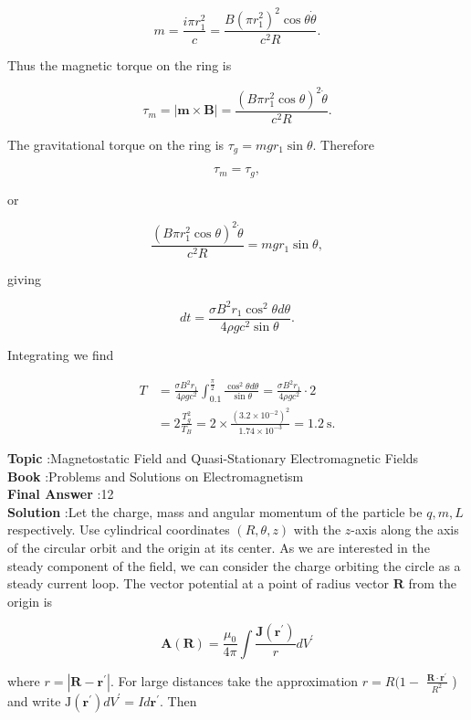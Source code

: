 \documentclass[10pt]{article}
\begin{document}
$$
m=\frac{i \pi r_{1}^{2}}{c}=\frac{B\left(\pi r_{1}^{2}\right)^{2} \cos \theta \dot{\theta}}{c^{2} R} .
$$

Thus the magnetic torque on the ring is

$$
\tau_{m}=|\mathbf{m} \times \mathbf{B}|=\frac{\left(B \pi r_{1}^{2} \cos \theta\right)^{2} \dot{\theta}}{c^{2} R} .
$$

The gravitational torque on the ring is $\tau_{g}=m g r_{1} \sin \theta$. Therefore

$$
\tau_{m}=\tau_{g},
$$

or

$$
\frac{\left(B \pi r_{1}^{2} \cos \theta\right)^{2} \dot{\theta}}{c^{2} R}=m g r_{1} \sin \theta,
$$

giving

$$
d t=\frac{\sigma B^{2} r_{1} \cos ^{2} \theta d \theta}{4 \rho g c^{2} \sin \theta} .
$$

Integrating we find

$$
\begin{aligned}
T &=\frac{\sigma B^{2} r_{1}}{4 \rho g c^{2}} \int_{0.1}^{\frac{\pi}{2}} \frac{\cos ^{2} \theta d \theta}{\sin \theta}=\frac{\sigma B^{2} r_{1}}{4 \rho g c^{2}} \cdot 2 \\
&=2 \frac{T_{g}^{2}}{T_{B}}=2 \times \frac{\left(3.2 \times 10^{-2}\right)^{2}}{1.74 \times 10^{-3}}=1.2 \mathrm{~s} .
\end{aligned}
$$



\textbf{Topic} :Magnetostatic Field and Quasi-Stationary Electromagnetic Fields\\
\textbf{Book} :Problems and Solutions on Electromagnetism\\
\textbf{Final Answer} :12 \\


\textbf{Solution} :Let the charge, mass and angular momentum of the particle be $q, m, L$ respectively. Use cylindrical coordinates $(R, \theta, z)$ with the $z$-axis along the axis of the circular orbit and the origin at its center. As we are interested in the steady component of the field, we can consider the charge orbiting the circle as a steady current loop. The vector potential at a point of radius vector $\mathbf{R}$ from the origin is

$$
\mathbf{A}(\mathbf{R})=\frac{\mu_{0}}{4 \pi} \int \frac{\mathbf{J}\left(\mathbf{r}^{\prime}\right)}{r} d V^{\prime}
$$

where $r=\left|\mathbf{R}-\mathbf{r}^{\prime}\right|$. For large distances take the approximation $r=R(1-$ $\frac{\mathbf{R} \cdot \mathbf{r}^{\prime}}{R^{2}}$ ) and write $\mathrm{J}\left(\mathbf{r}^{\prime}\right) d V^{\prime}=I d \mathbf{r}^{\prime}$. Then
\end{document}
